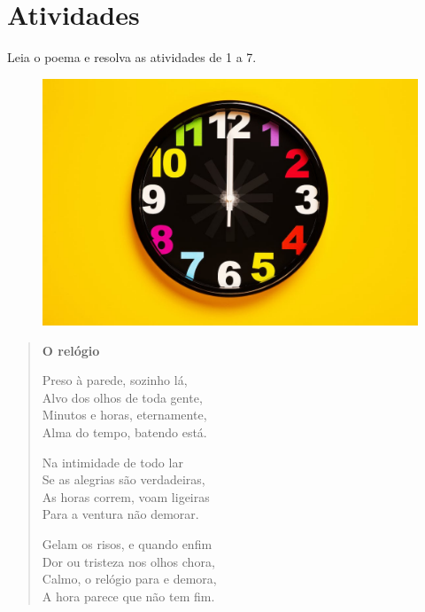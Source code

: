 \section{Atividades}

Leia o poema e resolva as atividades de 1 a 7.


\begin{figure}[htpb!]
\centering
\includegraphics[width=.8\textwidth]{./media/image16.jpeg}
\end{figure}

\begin{verse}
\textbf{O relógio}

Preso à parede, sozinho lá,\\
Alvo dos olhos de toda gente,\\
Minutos e horas, eternamente,\\
Alma do tempo, batendo está.

Na intimidade de todo lar\\
Se as alegrias são verdadeiras,\\
As horas correm, voam ligeiras\\
Para a ventura não demorar.

Gelam os risos, e quando enfim\\
Dor ou tristeza nos olhos chora,\\
Calmo, o relógio para e demora,\\
A hora parece que não tem fim.
\end{verse}


